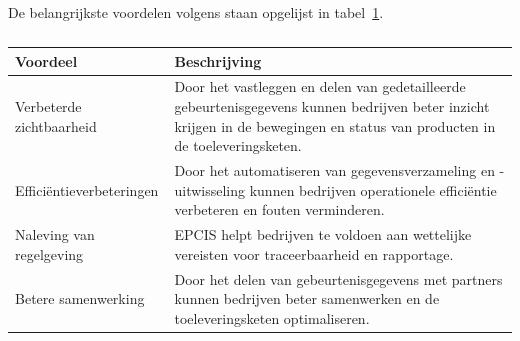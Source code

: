 De belangrijkste voordelen volgens \textcite{GS12025} staan opgelijst in tabel~\ref{tab:epcis-voordelen}.
\begin{table}[H]
    \centering
     \begin{tabular}{lp{}}
          \toprule
          \textbf{Voordeel} & \textbf{Beschrijving} \\
          \toprule
          Verbeterde zichtbaarheid & Door het vastleggen en delen van gedetailleerde gebeurtenisgegevens kunnen bedrijven beter inzicht krijgen in de bewegingen en status van producten in de toeleveringsketen. \\
          \midrule
          Efficiëntieverbeteringen & Door het automatiseren van gegevensverzameling en -uitwisseling kunnen bedrijven operationele efficiëntie verbeteren en fouten verminderen. \\
          \midrule
          Naleving van regelgeving & EPCIS helpt bedrijven te voldoen aan wettelijke vereisten voor traceerbaarheid en rapportage. \\
          \midrule
          Betere samenwerking & Door het delen van gebeurtenisgegevens met partners kunnen bedrijven beter samenwerken en de toeleveringsketen optimaliseren. \\
          \bottomrule
     \end{tabular}
     \caption[Belangrijkste voordelen van EPCIS volgens GS1]{\label{tab:epcis-voordelen}}
\end{table}


